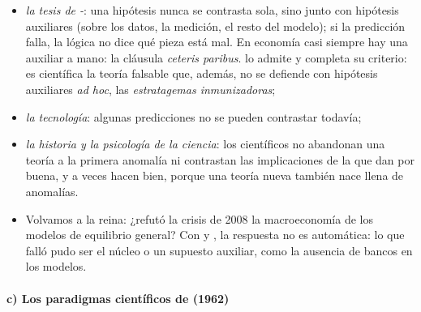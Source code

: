 \documentclass[11pt]{article}
\begin{document}
\begin{itemize}
\begin{itemize}
  \item \emph{la tesis de -}: una hipótesis nunca se contrasta sola, sino junto con hipótesis auxiliares (sobre los datos, la medición, el resto del modelo); si la predicción falla, la lógica no dice qué pieza está mal\nocite{Duhem1906Theorie,Quine1951Dogmas}. En economía casi siempre hay una auxiliar a mano: la cláusula \emph{ceteris paribus}.  lo admite y completa su criterio: es científica la teoría falsable que, además, no se defiende con hipótesis auxiliares \emph{ad hoc}, las \emph{estratagemas inmunizadoras};
  \item \emph{la tecnología}: algunas predicciones no se pueden contrastar todavía;
  \item \emph{la historia y la psicología de la ciencia}: los científicos no abandonan una teoría a la primera anomalía ni contrastan las implicaciones de la que dan por buena, y a veces hacen bien, porque una teoría nueva también nace llena de anomalías.
  \end{itemize}
  \begin{itemize}
  \item Volvamos a la reina: ¿refutó la crisis de 2008 la macroeconomía de los modelos de equilibrio general? Con  y , la respuesta no es automática: lo que falló pudo ser el núcleo o un supuesto auxiliar, como la ausencia de bancos en los modelos.
  \end{itemize}
\end{itemize}

\paragraph{c) Los paradigmas científicos de  (1962)}
\end{document}
